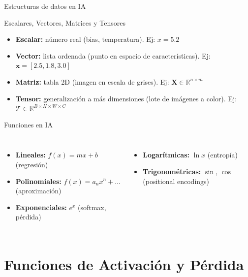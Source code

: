 \documentclass[aspectratio=169, 10pt, xcolor=table]{beamer}
\begin{document}
\begin{frame}{Estructuras de datos en IA}
    \begin{block}{Escalares, Vectores, Matrices y Tensores}
        \begin{itemize}
            \item \textbf{Escalar:} número real (bias, temperatura). Ej: $x = 5.2$
            \item \textbf{Vector:} lista ordenada (punto en espacio de características). Ej: $\mathbf{x}=[2.5,1.8,3.0]$
            \item \textbf{Matriz:} tabla 2D (imagen en escala de grises). Ej: $\mathbf{X}\in\mathbb{R}^{n\times m}$
            \item \textbf{Tensor:} generalización a más dimensiones (lote de imágenes a color). Ej: $\mathcal{T}\in\mathbb{R}^{B\times H\times W\times C}$
        \end{itemize}
    \end{block}
\end{frame}

\begin{frame}{Funciones en IA}
    \begin{columns}[t]
        \begin{itemize}
            \item \textbf{Lineales:} $f(x)=mx+b$ (regresión)
            \item \textbf{Polinomiales:} $f(x)=a_nx^n+\dots$ (aproximación)
            \item \textbf{Exponenciales:} $e^x$ (softmax, pérdida)
        \end{itemize}
        \begin{itemize}
            \item \textbf{Logarítmicas:} $\ln x$ (entropía)
            \item \textbf{Trigonométricas:} $\sin$, $\cos$ (positional encodings)
        \end{itemize}
    \end{columns}
\end{frame}

\section{Funciones de Activación y Pérdida}
\end{document}
